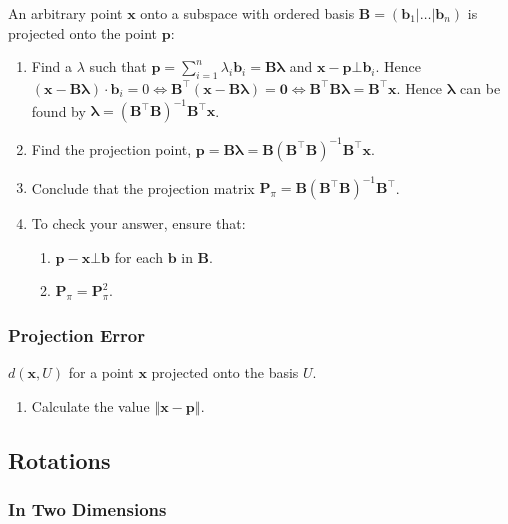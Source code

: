 \documentclass[10pt,twoside,twocolumn]{article}
\begin{document}
An arbitrary point $\mathbf{x}$ onto a subspace with ordered basis
$\mathbf{B}=\left(\mathbf{b}_{1}|\dots|\mathbf{b}_{n}\right)$ is
projected onto the point $\mathbf{p}$: 
\begin{enumerate}
\item Find a $\lambda$ such that $\mathbf{p}=\sum_{i=1}^{n}\lambda_{i}\mathbf{b}_{i}=\mathbf{B}\mathbf{\lambda}$
and $\mathbf{x}-\mathbf{p}\bot\mathbf{b}_{i}$. Hence $\left(\mathbf{x}-\mathbf{B}\mathbf{\lambda}\right)\cdot\mathbf{b}_{i}=0\iff\mathbf{B}^{\top}\left(\mathbf{x}-\mathbf{B}\mathbf{\mathbf{\lambda}}\right)=\boldsymbol{0}\iff\mathbf{B}^{\top}\mathbf{B}\mathbf{\mathbf{\lambda}}=\mathbf{B}^{\top}\mathbf{x}$.
Hence $\mathbf{\lambda}$ can be found by $\boxed{\mathbf{\mathbf{\lambda}}=\left(\mathbf{B}^{\top}\mathbf{B}\right)^{-1}\mathbf{B}^{\top}\mathbf{x}}$.
\item Find the projection point, $\boxed{\mathbf{p}=\mathbf{B}\mathbf{\lambda}}=\mathbf{B}\left(\mathbf{B}^{\top}\mathbf{B}\right)^{-1}\mathbf{B}^{\top}\mathbf{x}$. 
\item Conclude that the projection matrix $\boxed{\mathbf{P}_{\pi}=\mathbf{B}\left(\mathbf{B}^{\top}\mathbf{B}\right)^{-1}\mathbf{B}^{\top}}$.
\item To check your answer, ensure that:

\begin{enumerate}
\item \textbf{$\mathbf{p}-\mathbf{x}\bot\mathbf{b}$} for each $\mathbf{b}$
in $\mathbf{B}$.
\item $\mathbf{P}_{\pi}=\mathbf{P}_{\pi}^{2}$.
\end{enumerate}
\end{enumerate}

\subsubsection{Projection Error}

$d\left(\mathbf{x},U\right)$ for a point $\mathbf{x}$ projected
onto the basis $U$.
\begin{enumerate}
\item Calculate the value $\left\Vert \mathbf{x}-\mathbf{p}\right\Vert $.
\end{enumerate}

\subsection{Rotations}


\subsubsection{In Two Dimensions}
\end{document}
